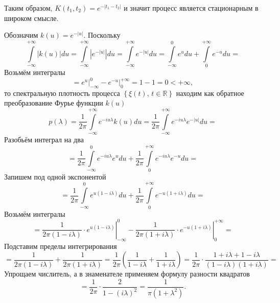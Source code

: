 Таким образом, $K \left( t_1, t_2 \right) = e^{-\left| t_1 - t_2 \right| }$
и значит процесс является стационарным в широком смысле.

Обозначим $k \left( u \right) = e^{-\left| u \right| }$.
Поскольку
$$ \int \limits_{-\infty }^{+\infty } \left| k \left( u \right) \right| du =
  \int \limits_{-\infty }^{+\infty } \left| e^{-\left| u \right| } \right| du =
  \int \limits_{-\infty }^{+\infty } e^{-\left| u \right| } du =
  \int \limits_{-\infty }^0 e^u du + \int \limits_0^{+\infty } e^{-u} du =$$
Возьмём интегралы
$$= \left. e^u \right|_{-\infty }^0 - \left. e^{-u} \right|_0^{+\infty } =
  1 - 1 =
  0 <
  + \infty,$$
то спектральную плотность процесса $ \left\{ \xi \left( t \right), \, t \in \mathbb{R} \right\} $
находим как обратное преобразование Фурье функции $k \left( u \right) $
$$p \left( \lambda \right) =
  \frac{1}{2 \pi } \int \limits_{-\infty }^{+\infty } e^{-iu \lambda } k \left( u \right) du =
  \frac{1}{2 \pi } \int \limits_{-\infty }^{+\infty } e^{-iu \lambda } e^{-\left| u \right| } du =$$
Разобьём интеграл на два
$$= \frac{1}{2 \pi } \int \limits_{-\infty }^0 e^{-iu \lambda } e^u du +
  \frac{1}{2 \pi } \int \limits_0^{+ \infty } e^{-iu \lambda } e^{-u} du =$$
Запишем под одной экспонентой
$$= \frac{1}{2 \pi } \int \limits_{-\infty }^0 e^{u \left( 1 - i \lambda \right) } du +
  \frac{1}{2 \pi } \int \limits_0^{+\infty } e^{-u \left( 1 + i \lambda \right) } du =$$
Возьмём интегралы
$$= \left.
    \frac{1}{2 \pi \left( 1 - i \lambda \right) } \cdot e^{u \left( 1 - i \lambda \right) }
  \right|_{-\infty }^0 -
  \left.
    \frac{1}{2 \pi \left( 1 + i \lambda \right) } \cdot e^{-u \left( 1 + i \lambda \right) }
  \right|_0^{+\infty } =$$
Подставим пределы интегрирования
$$= \frac{1}{2 \pi \left( 1 - i \lambda \right) } + \frac{1}{2 \pi \left( 1 + i \lambda \right) } =
  \frac{1}{2 \pi } \left( \frac{1}{1 - i \lambda } + \frac{1}{1 + i \lambda } \right) =
  \frac{1}{2 \pi } \cdot
  \frac{1 + i \lambda + 1 - i \lambda }{ \left( 1 - i \lambda \right) \left( 1 + i \lambda \right) } =$$
Упрощаем числитель, а в знаменателе применяем формулу разности квадратов
$$= \frac{1}{2 \pi } \cdot \frac{2}{1 - \left( i \lambda \right)^2} =
  \frac{1}{ \pi \left( 1 + \lambda^2 \right) }.$$
